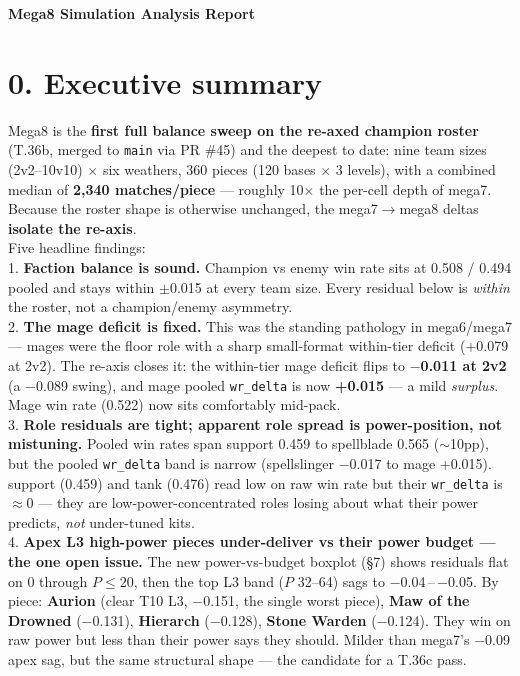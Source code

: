 \documentclass[10pt]{article}
\begin{document}
\begin{center}{\LARGE\bfseries Mega8 Simulation Analysis Report}\end{center}\vspace{6pt}

\section*{0. Executive summary}

Mega8 is the \textbf{first full balance sweep on the re-axed champion roster} (T.36b, merged to \texttt{main} via PR \#45) and the deepest to date: nine team sizes (2v2--10v10) $\times$ six weathers, 360 pieces (120 bases $\times$ 3 levels), with a combined median of \textbf{2{,}340 matches/piece} --- roughly 10$\times$ the per-cell depth of mega7. Because the roster shape is otherwise unchanged, the mega7$\rightarrow$mega8 deltas \textbf{isolate the re-axis}.\\

Five headline findings:\\

1. \textbf{Faction balance is sound.} Champion vs enemy win rate sits at 0.508 / 0.494 pooled and stays within $\pm$0.015 at every team size. Every residual below is \emph{within} the roster, not a champion/enemy asymmetry.\\

2. \textbf{The mage deficit is fixed.} This was the standing pathology in mega6/mega7 --- mages were the floor role with a sharp small-format within-tier deficit (+0.079 at 2v2). The re-axis closes it: the within-tier mage deficit flips to \textbf{$-$0.011 at 2v2} (a $-$0.089 swing), and mage pooled \texttt{wr\_\allowbreak{}delta} is now \textbf{+0.015} --- a mild \emph{surplus}. Mage win rate (0.522) now sits comfortably mid-pack.\\

3. \textbf{Role residuals are tight; apparent role spread is power-position, not mistuning.} Pooled win rates span support 0.459 to spellblade 0.565 ($\sim$10pp), but the pooled \texttt{wr\_\allowbreak{}delta} band is narrow (spellslinger $-$0.017 to mage +0.015). support (0.459) and tank (0.476) read low on raw win rate but their \texttt{wr\_\allowbreak{}delta} is $\approx$0 --- they are low-power-concentrated roles losing about what their power predicts, \emph{not} under-tuned kits.\\

4. \textbf{Apex L3 high-power pieces under-deliver vs their power budget --- the one open issue.} The new power-vs-budget boxplot (\S{}7) shows residuals flat on 0 through $P\!\le\!20$, then the top L3 band ($P$ 32--64) sags to $-$0.04\,--\,$-$0.05. By piece: \textbf{Aurion} (clear T10 L3, $-$0.151, the single worst piece), \textbf{Maw of the Drowned} ($-$0.131), \textbf{Hierarch} ($-$0.128), \textbf{Stone Warden} ($-$0.124). They win on raw power but less than their power says they should. Milder than mega7's $-$0.09 apex sag, but the same structural shape --- the candidate for a T.36c pass.\\
\end{document}

